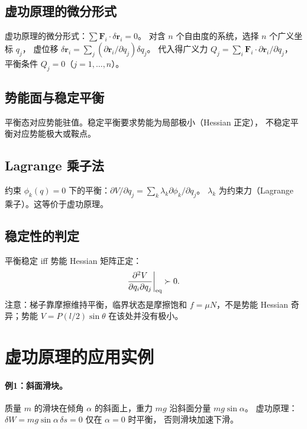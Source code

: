 \documentclass[UTF8,a4paper,11pt]{ctexart}
\begin{document}
\subsection{虚功原理的微分形式}
\label{sub:diff-vw}

虚功原理的微分形式：$\sum \boldsymbol F_i\cdot\delta\boldsymbol r_i=0$。
对含 $n$ 个自由度的系统，选择 $n$ 个广义坐标 $q_j$，
虚位移 $\delta\boldsymbol r_i=\sum_j (\partial\boldsymbol r_i/\partial q_j)\delta q_j$。
代入得广义力 $Q_j=\sum_i \boldsymbol F_i\cdot\partial\boldsymbol r_i/\partial q_j$，
平衡条件 $Q_j=0$（$j=1,\ldots,n$）。

\subsection{势能面与稳定平衡}
\label{sub:potential-surface}

平衡态对应势能驻值。稳定平衡要求势能为局部极小（Hessian 正定），
不稳定平衡对应势能极大或鞍点。

\subsection{Lagrange 乘子法}
\label{sub:lagrange-multipliers}

约束 $\phi_k(q)=0$ 下的平衡：$\partial V/\partial q_j=\sum_k \lambda_k \partial\phi_k/\partial q_j$。
$\lambda_k$ 为约束力（Lagrange 乘子）。这等价于虚功原理。

\subsection{稳定性的判定}
\label{sub:stability}

平衡稳定 iff 势能 Hessian 矩阵正定：
\begin{equation}
  \frac{\partial^2 V}{\partial q_i\partial q_j}\bigg|_{\rm eq} \succ 0.
\end{equation}
注意：梯子靠摩擦维持平衡，临界状态是摩擦饱和 $f=\mu N$，不是势能 Hessian 奇异；势能 $V=P(l/2)\sin\theta$ 在该处并没有极小。

\section{虚功原理的应用实例}
\label{sec:examples}

\paragraph{例1：斜面滑块。}
质量 $m$ 的滑块在倾角 $\alpha$ 的斜面上，重力 $mg$ 沿斜面分量 $mg\sin\alpha$。
虚功原理：$\delta W=mg\sin\alpha\,\delta s=0$ 仅在 $\alpha=0$ 时平衡，
否则滑块加速下滑。
\end{document}
